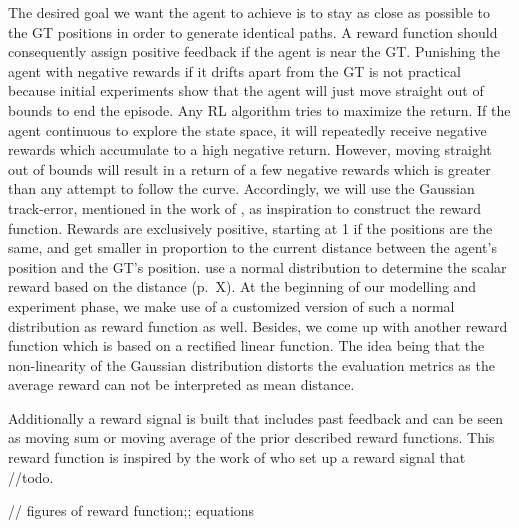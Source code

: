 The desired goal we want the agent to achieve is to stay as close as possible to the GT positions in order to generate identical paths. A reward function should consequently assign positive feedback if the agent is near the GT. Punishing the agent with negative rewards if it drifts apart from the GT is not practical because initial experiments show that the agent will just move straight out of bounds to end the episode. Any RL algorithm tries to maximize the return. If the agent continuous to explore the state space, it will repeatedly receive negative rewards which accumulate to a high negative return. However, moving straight out of bounds will result in a return of a few negative rewards which is greater than any attempt to follow the curve. Accordingly, we will use the Gaussian track-error, mentioned in the work of \cite{martinsen2018curved}, as inspiration to construct the reward function. Rewards are exclusively positive, starting at 1 if the positions are the same, and get smaller in proportion to the current distance between the agent's position and the GT's position. \cite{martinsen2018curved} use a normal distribution to determine the scalar reward based on the distance (p.~X). At the beginning of our modelling and experiment phase, we make use of a customized version of such a normal distribution as reward function as well. Besides, we come up with another reward function which is based on a rectified linear function. The idea being that the non-linearity of the Gaussian distribution distorts the evaluation metrics as the average reward can not be interpreted as mean distance. 
\par
Additionally a reward signal is built that includes past feedback and can be seen as moving sum or moving average of the prior described reward functions. This reward function is inspired by the work of \cite{edgarod} who set up a reward signal that //todo.


// figures of reward function;; equations